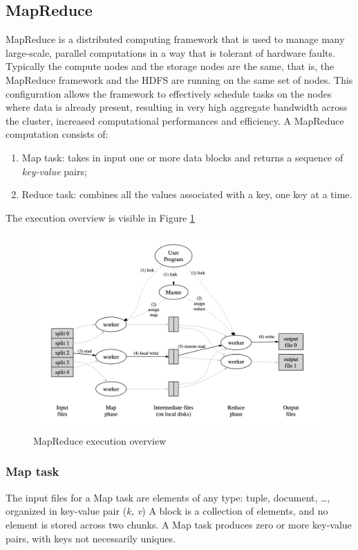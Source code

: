 \documentclass[\main/main.tex]{subfiles}
\begin{document}
\subsection{MapReduce}
MapReduce \cite{Dean2004MapReduceSD} is a distributed computing framework that is used to manage many large-scale, parallel computations in a way that is tolerant of hardware faults. Typically the compute nodes and the storage nodes are the same, that is, the MapReduce framework and the HDFS are running on the same set of nodes. This configuration allows the framework to effectively schedule tasks on the nodes where data is already present, resulting in very high aggregate bandwidth across the cluster, increased computational performances and efficiency. A MapReduce computation consists of:
\begin{enumerate}
    \item Map task: takes in input one or more data blocks and returns a sequence of \emph{key-value} pairs;
    \item Reduce task: combines all the values associated with a key, one key at a time.
\end{enumerate}
The execution overview is visible in Figure \ref{fig:map_reduce}
\begin{figure}[H]
    \centering
    \includegraphics[scale=.35]{images/cluster_computing/map_reduce_schema.png}
    \caption{MapReduce execution overview}
    \label{fig:map_reduce}
\end{figure}
\subsubsection{Map task}
The input files for a Map task are elements of any type: tuple, document, \dots, organized in key-value pair (\emph{k, v})
A block is a collection of elements, and no element is stored across two chunks. 
A Map task produces zero or more key-value pairs, with keys not necessarily uniques.
\end{document}
